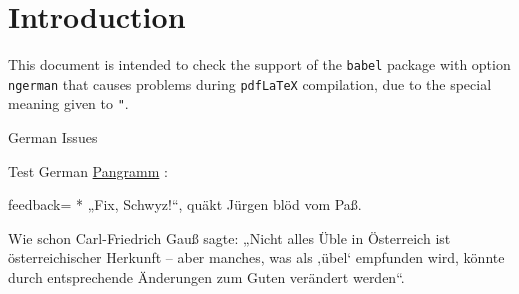 \documentclass{article}
\def\myquestiontext{ \underline{Pangramm} :}
\def\pangramme{\glqq Fix, Schwyz!\grqq, qu\"akt J\"urgen bl\"od vom Pa\ss.}
\def\pangrammeother{Wie schon Carl-Friedrich Gau\ss\ %
  sagte: \glqq Nicht alles \"Uble in \"Osterreich ist 
  \"osterreichischer Herkunft -- aber manches, was als \glq 
  \"ubel\grq\ empfunden wird, k\"onnte durch entsprechende 
  \"Anderungen zum Guten ver\"andert werden\grqq.}
\def\myfeedback{}
\def\myquestiontext{ \underline{Pangramm} :}
\def\pangramme{„Fix, Schwyz!“, quäkt Jürgen blöd vom Paß.}
\def\pangrammeother{Wie schon Carl-Friedrich Gauß sagte: 
  „Nicht alles Üble in Österreich ist österreichischer 
  Herkunft – aber manches, was als ‚übel‘ empfunden wird, 
  könnte durch entsprechende Änderungen zum Guten verändert 
  werden“.}
\def\myfeedback{}
\begin{document}
\section*{Introduction}

This document is intended to check the support of the \texttt{babel} package 
with option \texttt{ngerman} that causes problems during \texttt{pdfLaTeX} 
compilation, due to the special meaning given to \verb|"|.

\begin{quiz}[points=1]{German Issues}
\ifPDFTeX
\fi
\begin{multi}[feedback={}]{Test German}
\myquestiontext
\item[feedback={\myfeedback}]* \pangramme
\item \pangrammeother
\end{multi}
\end{quiz}
\end{document}
